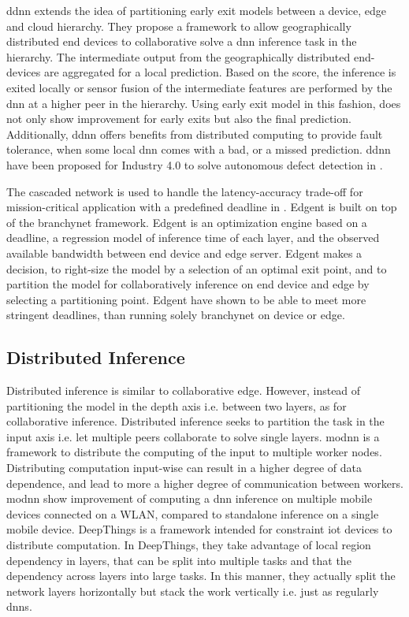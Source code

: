 \begin{enumdescript}
	\gls{ddnn} \cite{teerapittayanon_distributed_2017} extends the idea of partitioning early exit models between a device, edge and cloud hierarchy. They propose a framework to allow geographically distributed end devices to collaborative solve a \gls{dnn} inference task in the hierarchy. The intermediate output from the geographically distributed end-devices are aggregated for a local prediction. Based on the score, the inference is exited locally or sensor fusion of the intermediate features are performed by the \gls{dnn} at a higher peer in the hierarchy. Using early exit model in this fashion, does not only show improvement for early exits but also the final prediction. Additionally, \gls{ddnn} offers benefits from distributed computing to provide fault tolerance, when some local \gls{dnn} comes with a bad, or a missed prediction. \gls{ddnn} have been proposed for Industry 4.0 to solve autonomous defect detection in \cite{li_deep_2018}. 
	
	The cascaded network is used to handle the latency-accuracy trade-off for mission-critical application with a predefined deadline in \cite{li_edge_2018}.  Edgent \cite{li_edge_2018} is built on top of the \gls{branchynet} framework. Edgent is an optimization engine based on a deadline, a regression model of inference time of each layer, and the observed available bandwidth between end device and edge server. Edgent makes a decision, to right-size the model by a selection of an optimal exit point, and to partition the model for collaboratively inference on end device and edge by selecting a partitioning point. Edgent have shown to be able to meet more stringent deadlines, than running solely \gls{branchynet} on device or edge.
\end{enumdescript}

\subsection{Distributed Inference}

Distributed inference is similar to collaborative edge. However, instead of partitioning the model in the depth axis i.e. between two layers, as for collaborative inference. Distributed inference seeks to partition the task in the input axis i.e. let multiple peers collaborate to solve single layers. \gls{modnn} \cite{mao_modnn:_2017} is a framework to distribute the computing of the input to multiple worker nodes. Distributing computation input-wise can result in a higher degree of data dependence, and lead to more a higher degree of communication between workers. \gls{modnn} show improvement of computing a \gls{dnn} inference on multiple mobile devices connected on a WLAN, compared to standalone inference on a single mobile device. DeepThings \cite{zhao_deepthings:_2018} is a framework intended for constraint \gls{iot} devices to distribute computation. In DeepThings, they take advantage of local region dependency in layers, that can be split into multiple tasks and that the dependency across layers into large tasks. In this manner, they actually split the network layers horizontally but stack the work vertically i.e. just as regularly \gls{dnn}s.